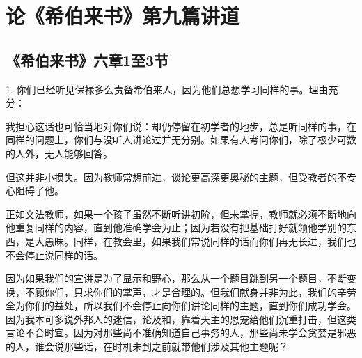 

\section{论《希伯来书》第九篇讲道}


\subsection{《希伯来书》六章1至3节}

\par

1. 你们已经听见保禄多么责备希伯来人，因为他们总想学习同样的事。理由充分：\par

我担心这话也可恰当地对你们说：却仍停留在初学者的地步，总是听同样的事，在同样的问题上，你们与没听人讲论过并无分别。如果有人考问你们，除了极少可数的人外，无人能够回答。\par

但这并非小损失。因为教师常想前进，谈论更高深更奥秘的主题，但受教者的不专心阻碍了他。\par

正如文法教师，如果一个孩子虽然不断听讲初阶，但未掌握，教师就必须不断地向他重复同样的内容，直到他准确学会为止；因为若没有把基础打好就领他学别的东西，是大愚昧。同样，在教会里，如果我们常说同样的话而你们再无长进，我们也不会停止说同样的话。\par

因为如果我们的宣讲是为了显示和野心，那么从一个题目跳到另一个题目，不断变换，不顾你们，只求你们的掌声，才是合理的。但我们献身并非为此，我们的辛劳全为你们的益处，所以我们不会停止向你们讲论同样的主题，直到你们成功学会。因为我本可多说外邦人的迷信，论及和，靠着天主的恩宠给他们沉重打击，但这类言论不合时宜。因为对那些尚不准确知道自己事务的人，那些尚未学会贪婪是邪恶的人，谁会说那些话，在时机未到之前就带他们涉及其他主题呢？\par

